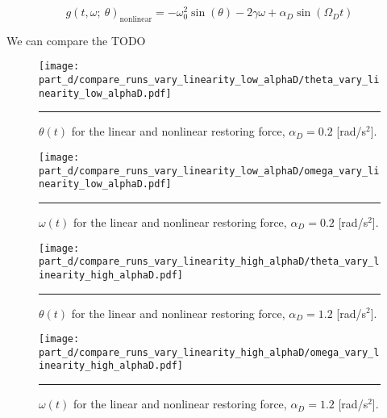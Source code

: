 \documentclass[notitlepage,aps,prd,nofootinbib]{revtex4-1}
\begin{document}
\begin{equation}
\label{eq:nonlinear_g}
g\left(t, \omega;~\theta\right)_{\text{nonlinear}} = -\omega_{0}^2 \sin\left(\theta\right) - 2\gamma \omega + \alpha_{D}\sin\left(\Omega_{D} t\right)
\end{equation}

We can compare the TODO

\begin{figure}[!htbc]
  \centering
  \texttt{[image: part\_d/compare\_runs\_vary\_linearity\_low\_alphaD/theta\_vary\_linearity\_low\_alphaD.pdf]}
	{\par\nobreak\rule[9pt]{35em}{0.5pt}\vspace{-5mm}}
	\caption{$\theta\left(t\right)$ for the linear and nonlinear restoring force, $\alpha_{D} = 0.2$ [rad/s$^2$].}
	\label{fig:theta_vary_linearity_low_alphaD}
\end{figure}

\begin{figure}[!htbc]
  \centering
  \texttt{[image: part\_d/compare\_runs\_vary\_linearity\_low\_alphaD/omega\_vary\_linearity\_low\_alphaD.pdf]}
	{\par\nobreak\rule[9pt]{35em}{0.5pt}\vspace{-5mm}}
	\caption{$\omega\left(t\right)$ for the linear and nonlinear restoring force, $\alpha_{D} = 0.2$ [rad/s$^2$].}
	\label{fig:omega_vary_linearity_low_alphaD}
\end{figure}

\begin{figure}[!htbc]
  \centering
  \texttt{[image: part\_d/compare\_runs\_vary\_linearity\_high\_alphaD/theta\_vary\_linearity\_high\_alphaD.pdf]}
	{\par\nobreak\rule[9pt]{35em}{0.5pt}\vspace{-5mm}}
	\caption{$\theta\left(t\right)$ for the linear and nonlinear restoring force, $\alpha_{D} = 1.2$ [rad/s$^2$].}
	\label{fig:theta_vary_linearity_high_alphaD}
\end{figure}

\begin{figure}[!htbc]
  \centering
  \texttt{[image: part\_d/compare\_runs\_vary\_linearity\_high\_alphaD/omega\_vary\_linearity\_high\_alphaD.pdf]}
	{\par\nobreak\rule[9pt]{35em}{0.5pt}\vspace{-5mm}}
	\caption{$\omega\left(t\right)$ for the linear and nonlinear restoring force, $\alpha_{D} = 1.2$ [rad/s$^2$].}
	\label{fig:omega_vary_linearity_high_alphaD}
\end{figure}
\end{document}
